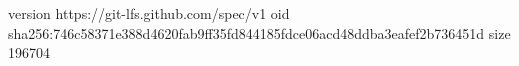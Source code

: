 version https://git-lfs.github.com/spec/v1
oid sha256:746c58371e388d4620fab9ff35fd844185fdce06acd48ddba3eafef2b736451d
size 196704
